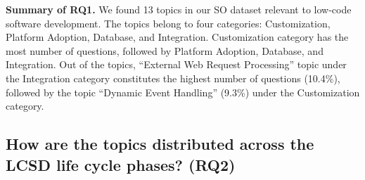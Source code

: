 \begin{tcolorbox}[flushleft upper,boxrule=1pt,arc=0pt,left=0pt,right=0pt,top=0pt,bottom=0pt,colback=white,after=\ignorespacesafterend\par\noindent]
\noindent\textbf{Summary of RQ1.} We found 13 topics in our SO dataset relevant to low-code
software development.  The topics belong to four categories: Customization,
Platform Adoption, Database, and Integration. Customization category has the
most number of questions, followed by Platform Adoption, Database, and
Integration. Out of the topics, ``External Web Request Processing'' topic under
the Integration category constitutes the highest number of questions (10.4\%),
followed by the topic ``Dynamic Event Handling'' (9.3\%) under the Customization
category.
\end{tcolorbox} 







\subsection{How are the topics distributed across the  LCSD life cycle phases? (RQ2)}\label{sec:rq-topic-challenges}





